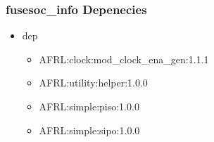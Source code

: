\subsubsection{fusesoc\_info Depenecies}
\begin{itemize}
\item dep
	\begin{itemize}
	\item AFRL:clock:mod\_clock\_ena\_gen:1.1.1
	\item AFRL:utility:helper:1.0.0
	\item AFRL:simple:piso:1.0.0
	\item AFRL:simple:sipo:1.0.0
	\end{itemize}
\end{itemize}
